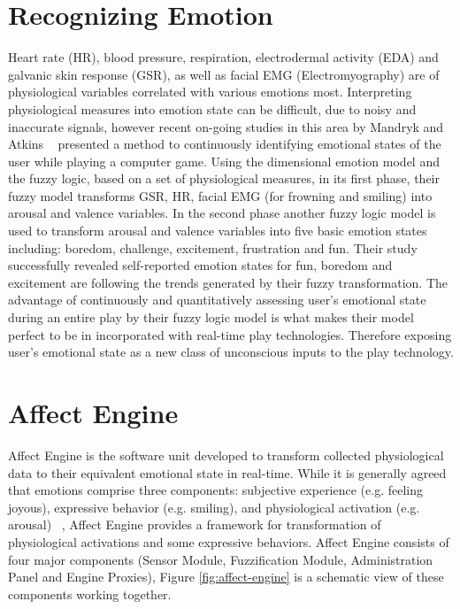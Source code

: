 
\section{Recognizing Emotion} %
Heart rate (HR), blood pressure, respiration, electrodermal activity (EDA) and galvanic skin response (GSR), as well as facial EMG (Electromyography) are of physiological variables correlated with various emotions most. Interpreting physiological measures into emotion state can be difficult, due to noisy and inaccurate signals, however recent on-going studies in this area by Mandryk and Atkins ~\cite{mandryk2007fuzzy} presented a method to continuously identifying emotional states of the user while playing a computer game. Using the dimensional emotion model and the fuzzy logic, based on a set of physiological measures, in its first phase, their fuzzy model transforms GSR, HR, facial EMG (for frowning and smiling) into arousal and valence variables. In the second phase another fuzzy logic model is used to transform arousal and valence variables into five basic emotion states including: boredom, challenge, excitement, frustration and fun. Their study successfully revealed self-reported emotion states for fun, boredom and excitement are following the trends generated by their fuzzy transformation. The advantage of continuously and quantitatively assessing user's emotional state during an entire play by their fuzzy logic model is what makes their model perfect to be in incorporated with real-time play technologies. Therefore exposing user's emotional state as a new class of unconscious inputs to the play technology.

\section{Affect Engine} %
Affect Engine is the software unit developed to transform collected physiological data to their equivalent emotional state in real-time. While it is generally agreed that emotions comprise three components: subjective experience (e.g. feeling joyous), expressive behavior (e.g. smiling), and physiological activation (e.g. arousal) ~\cite{scherer1993neuroscience}, Affect Engine provides a framework for transformation of physiological activations and some expressive behaviors. Affect Engine consists of four major components (Sensor Module, Fuzzification Module, Administration Panel and Engine Proxies), Figure \ref{fig:affect-engine} is a schematic view of these components working together.

